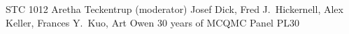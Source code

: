 	{STC 1012}	%
	{Aretha Teckentrup (moderator)}		%
	{Josef Dick, Fred J.\ Hickernell, Alex Keller, Frances Y.~Kuo, Art Owen}	%
	{30 years of MCQMC Panel}		%
	{PL30}			%
	\\\hline
